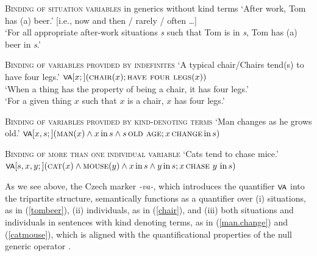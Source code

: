 \documentclass[output=paper,colorlinks,citecolor=brown]{langscibook}
\begin{document}
\ea \textsc{Binding of situation variables} in generics without kind terms
\glt `After work, Tom has (a) beer.' [i.e., now and then / rarely / often \ldots]
\\
`For all appropriate after-work situations \textit{s} such that Tom is in \textit{s}, Tom has (a) beer in \textit{s}.’
\z
\z

\ea \textsc{Binding of variables provided by indefinites}
\glt `A typical chair/Chairs tend(s) to have four legs.’
\ex $\cnst{va} [x;] (\textsc{chair} (x) ; \textsc{have four legs} (x))$\\
`When a thing has the property of being a chair, it has four legs.’ \\
`For a given thing $x$ such that $x$ is a chair, $x$ has four legs.’
\z
\z

\ea \textsc{Binding of variables provided by kind-denoting terms}
\glt `Man changes as he grows old.'	 
\ex $\cnst{va}[x,s;] (\textsc{man}(x) \wedge x\, \textrm{in}\, s \wedge s\, \textsc{old age}; x\, \textsc{change}\, \textrm{in}\, s)$	\\
\z
\z

\newpage
\ea \textsc{Binding of more than one individual variable}
\glt `Cats tend to chase mice.’
\ex $\cnst{va}[s,x,y;] (\textsc{cat}(x) \wedge \textsc{mouse}(y) \wedge x\, \textrm{in}\, s  \wedge y\, \textrm{in}\, s ;
x\, \textsc{chase}\ y\ \textrm{in}\, s)$	\\
\z
\z


\noindent
As we see above, the Czech marker \textit{-va-},
which introduces the quantifier $\cnst{va}$ into  the tripartite structure, semantically functions as a quantifier
over (i) situations, as in (\ref{tombeer}), (ii) individuals, as in (\ref{chair}), and (iii) both situations and individuals in sentences with kind denoting terms, as in (\ref{man.change}) and
(\ref{catmouse}),
which is aligned
with the quantificational properties of the null generic operator .
\end{document}
